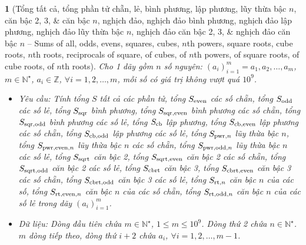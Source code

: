\documentclass{article}
\newtheorem{baitoan}{}
\begin{document}
\begin{baitoan}[Tổng tất cả, tổng phần tử chẵn, lẻ, bình phương, lập phương, lũy thừa bậc $n$, căn bậc 2, 3, \& căn bậc $n$, nghịch đảo, nghịch đảo bình phương, nghịch đảo lập phương, nghịch đảo lũy thừa bậc $n$, nghịch đảo căn bậc 2, 3, \& nghịch đảo căn bậc $n$ -- Sums of all, odds, evens, squares, cubes, $n$th powers, square roots, cube roots, $n$th roots, reciprocals of square, of cubes, of $n$th powers, of square roots, of cube roots, of $n$th roots]
	Cho 1 dãy gồm $n$ số nguyên: $(a_i)_{i=1}^m = a_1,a_2,\ldots,a_m$, $m\in\mathbb{N}^\star$, $a_i\in\mathbb{Z}$, $\forall i = 1,2,\ldots,m$, mỗi số có giá trị không vượt quá $10^9$.
	\begin{itemize}
		\item {\sf Yêu cầu:} Tính tổng $S$ tất cả các phần tử, tổng $S_{\rm even}$ các số chẵn, tổng $S_{\rm odd}$ các số lẻ, tổng $S_{\rm sqr}$ bình phương, tổng $S_{\rm sqr,even}$ bình phương các số chẵn, tổng $S_{\rm sqr,odd}$ bình phương các số lẻ, tổng $S_{\rm cb}$ lập phương, tổng $S_{\rm cb,even}$ lập phương các số chẵn, tổng $S_{\rm cb,odd}$ lập phương các số lẻ, tổng $S_{{\rm pwr},n}$ lũy thừa bậc $n$, tổng $S_{{\rm pwr,even},n}$ lũy thừa bậc $n$ các số chẵn, tổng $S_{{\rm pwr,odd},n}$ lũy thừa bậc $n$ các số lẻ, tổng $S_{\rm sqrt}$ căn bậc 2, tổng $S_{\rm sqrt,even}$ căn bậc 2 các số chẵn, tổng $S_{\rm sqrt,odd}$ căn bậc 2 các số lẻ, tổng $S_{\rm cbrt}$ căn bậc 3, tổng $S_{\rm cbrt,even}$ căn bậc 3 các số chẵn, tổng $S_{\rm cbrt,odd}$ căn bậc 3 các số lẻ, tổng $S_{{\rm rt},n}$ căn bậc $n$ của các số, tổng $S_{{\rm rt,even},n}$ căn bậc $n$ của các số chẵn, tổng $S_{{\rm rt,odd},n}$ căn bậc $n$ của các số lẻ trong dãy $(a_i)_{i=1}^m$.
		\item {\sf Dữ liệu:} Dòng đầu tiên chứa $m\in\mathbb{N}^\star$, $1\le m\le10^9$. Dòng thứ 2 chứa $n\in\mathbb{N}^\star$. $m$ dòng tiếp theo, dòng thứ $i + 2$ chứa $a_i$, $\forall i = 1,2,\ldots,m - 1$.
	\end{itemize}
\end{baitoan}
\end{document}
